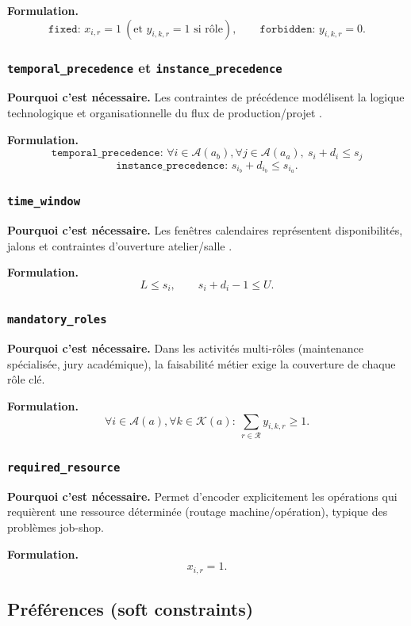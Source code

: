 \documentclass[12pt,a4paper]{article}
\begin{document}
\textbf{Formulation.}
\[
\texttt{fixed: } x_{i,r}=1\ (\text{et }y_{i,k,r}=1\text{ si rôle}),\qquad
\texttt{forbidden: } y_{i,k,r}=0.
\]

\subsubsection{\texttt{temporal\_precedence} et \texttt{instance\_precedence}}
\textbf{Pourquoi c'est nécessaire.}
Les contraintes de précédence modélisent la logique technologique et organisationnelle du flux de production/projet \cite{garey1976jssp,abdolrazzagh2017jssp}.

\textbf{Formulation.}
\[
\texttt{temporal\_precedence: }\forall i\in\mathcal{A}(a_b),\forall j\in\mathcal{A}(a_a),\ s_i+d_i\le s_j
\]
\[
\texttt{instance\_precedence: } s_{i_b}+d_{i_b}\le s_{i_a}.
\]

\subsubsection{\texttt{time\_window}}
\textbf{Pourquoi c'est nécessaire.}
Les fenêtres calendaires représentent disponibilités, jalons et contraintes d'ouverture atelier/salle \cite{torba2024msrcmpsp}.

\textbf{Formulation.}
\[
L \le s_i,\qquad s_i+d_i-1 \le U.
\]

\subsubsection{\texttt{mandatory\_roles}}
\textbf{Pourquoi c'est nécessaire.}
Dans les activités multi-rôles (maintenance spécialisée, jury académique), la faisabilité métier exige la couverture de chaque rôle clé.

\textbf{Formulation.}
\[
\forall i\in\mathcal{A}(a),\forall k\in\mathcal{K}(a):\ \sum_{r\in\mathcal{R}} y_{i,k,r}\ge 1.
\]

\subsubsection{\texttt{required\_resource}}
\textbf{Pourquoi c'est nécessaire.}
Permet d'encoder explicitement les opérations qui requièrent une ressource déterminée (routage machine/opération), typique des problèmes job-shop.

\textbf{Formulation.}
\[
x_{i,r}=1.
\]

\subsection{Préférences (soft constraints)}
\end{document}
